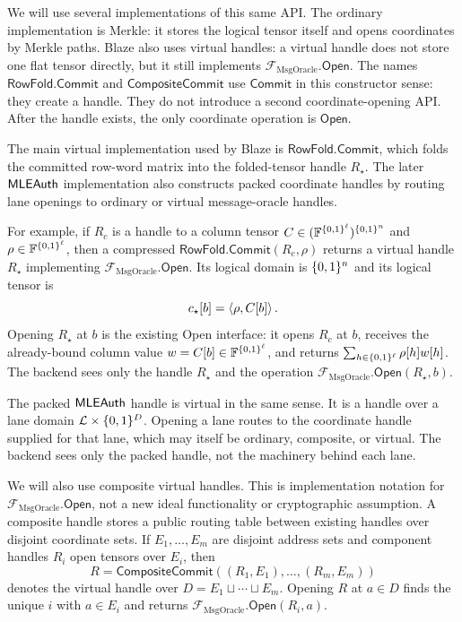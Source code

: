 We will use several implementations of this same API.  The ordinary
implementation is Merkle: it stores the logical tensor itself and opens
coordinates by Merkle paths.  Blaze also uses virtual handles: a virtual handle
does not store one flat tensor directly, but it still implements
\(\mathcal F_{\mathrm{MsgOracle}}.\mathsf{Open}\).  The names
\(\mathsf{RowFold.Commit}\) and \(\mathsf{CompositeCommit}\) use
\(\mathsf{Commit}\) in this constructor sense: they create a handle.  They do
not introduce a second coordinate-opening API.  After the handle exists, the
only coordinate operation is \(\mathsf{Open}\).

The main virtual implementation used by Blaze is
\(\mathsf{RowFold.Commit}\), which folds the committed row-word matrix into
the folded-tensor handle \(R_\star\).  The later \(\mathsf{MLEAuth}\) implementation
also constructs packed coordinate handles by routing lane openings to ordinary
or virtual message-oracle handles.

For example, if $R_c$ is a handle to a column tensor
$C\in(\mathbb{F}^{\{0,1\}^\ell})^{\{0,1\}^n}$ and $\rho\in\mathbb{F}^{\{0,1\}^\ell}$, then a compressed
\(\mathsf{RowFold.Commit}(R_c,\rho)\) returns a virtual
handle \(R_\star\) implementing
\(\mathcal F_{\mathrm{MsgOracle}}.\mathsf{Open}\).  Its logical domain is \(\{0,1\}^n\) and
its logical tensor is
\[
  c_\star[b]=\left\langle \rho,C[b] \right\rangle.
\]
Opening $R_\star$ at $b$ is the existing Open interface: it opens $R_c$ at
$b$, receives the already-bound column value \(w=C[b]\in\mathbb{F}^{\{0,1\}^\ell}\), and
returns \(\sum_{h\in\{0,1\}^\ell}\rho[h]w[h]\).  The backend sees only the handle
$R_\star$ and the operation
\(\mathcal F_{\mathrm{MsgOracle}}.\mathsf{Open}(R_\star,b)\).

The packed \(\mathsf{MLEAuth}\) handle is virtual in the same sense.  It is a handle
over a lane domain \(\mathcal L\times\{0,1\}^D\).  Opening a lane routes to the
coordinate handle supplied for that lane, which may itself be ordinary,
composite, or virtual.  The backend sees only the packed handle, not the
machinery behind each lane.

We will also use composite virtual handles.  This is implementation notation
for \(\mathcal F_{\mathrm{MsgOracle}}.\mathsf{Open}\), not a new ideal
functionality or cryptographic assumption.  A composite handle stores a public
routing table between existing handles over disjoint coordinate sets.  If
\(E_1,\ldots,E_m\) are disjoint address sets and component handles \(R_i\)
open tensors over \(E_i\), then
\[
  R=\mathsf{CompositeCommit}((R_1,E_1),\ldots,(R_m,E_m))
\]
denotes the virtual handle over \(D=E_1\sqcup\cdots\sqcup E_m\).  Opening
\(R\) at \(a\in D\) finds the unique \(i\) with \(a\in E_i\) and returns
\(\mathcal F_{\mathrm{MsgOracle}}.\mathsf{Open}(R_i,a)\).

